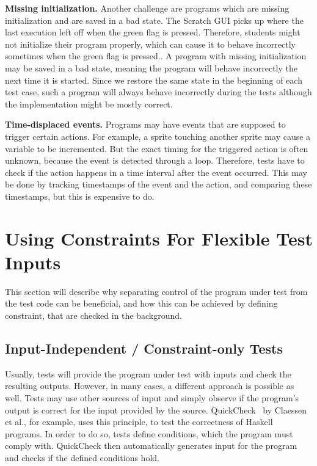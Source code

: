 \textbf{Missing initialization.}
Another challenge are programs which are missing initialization and are saved in a bad state.
The Scratch GUI picks up where the last execution left off when the green flag is pressed.
Therefore, students might not initialize their program properly,
which can cause it to behave incorrectly sometimes when the green flag is pressed..
A program with missing initialization may be saved in a bad state,
meaning the program will behave incorrectly the next time it is started.
Since we restore the same state in the beginning of each test case,
such a program will always behave incorrectly during the tests although the implementation might be mostly correct.
\parspace

\textbf{Time-displaced events.}
Programs may have events that are supposed to trigger certain actions.
For example, a sprite touching another sprite may cause a variable to be incremented.
But the exact timing for the triggered action is often unknown, because the event is detected through a loop.
Therefore, tests have to check if the action happens in a time interval after the event occurred.
This may be done by tracking timestamps of the event and the action, and comparing these timestamps,
but this is expensive to do.
\parspace

\chapter{Using Constraints For Flexible Test Inputs}
\label{cha:using_constraints_for_flexible_test_inputs}

This section will describe why separating control of the program under test from the test code can be beneficial,
and how this can be achieved by defining constraint, that are checked in the background.

\section{Input-Independent / Constraint-only Tests}
\label{sec:input_independent_constraint_only_tests}

Usually, tests will provide the program under test with inputs and check the resulting outputs.
However, in many cases, a different approach is possible as well.
Tests may use other sources of input and simply observe if the program's output is correct for the input provided by the source.
QuickCheck~\cite{quickcheck} by Claessen et al., for example, uses this principle, to test the correctness of Haskell programs.
In order to do so, tests define conditions, which the program must comply with.
QuickCheck then automatically generates input for the program and checks if the defined conditions hold.
\parspace

